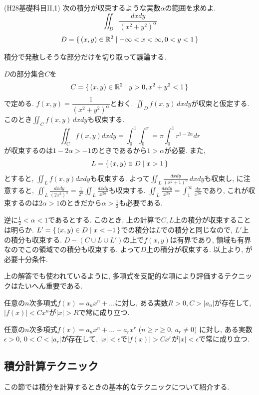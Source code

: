 \begin{egprob} (H28基礎科目II,1)
次の積分が収束するような実数$\alpha$の範囲を求めよ.
\[\iint_{D}\dfrac{dxdy}{(x^2+y^2)^{\alpha}}\]
\[D=\set{(x,y)\in \mathbb{R}^2\mid -\infty<x<\infty, 0<y<1}\]
\end{egprob}
\begin{point}
積分で発散しそうな部分だけを切り取って議論する.
\end{point}
\begin{egans}
$D$の部分集合$C$を
\[C= \set{(x,y)\in \mathbb{R}^2\mid y>0, x^2+y^2<1}\]
で定める. $f(x,y) = \dfrac{1}{(x^2+y^2)^{\alpha}}$とおく. $\iint_{D}f(x,y)\,dxdy$が収束と仮定する. このとき$\iint_{C}f(x,y)\,dxdy$も収束する.
\[\iint_{C}f(x,y)dxdy = \int_{0}^{1} \int_{0}^{\pi} = \pi\int_{0}^{1}r^{1-2\alpha}dr\]
が収束するのは$1-2\alpha > -1$のときであるから$1>\alpha$が必要. また,
\[L = \set{(x,y)\in D\mid x>1}\]
とすると, $\iint_{L}f(x,y)dxdy$も収束する. よって$\iint_{L}\frac{dxdy}{(x^2+1)^{\alpha}}\,dxdy$も収束し, に注意すると, $\iint_{L}\frac{dxdy}{(2x^2)^{\alpha}} = \frac{1}{2^{\alpha}} \iint_{L}\frac{dxdy}{x^{2\alpha}}$も収束する. $\iint_{L}\frac{dxdy}{x^{2\alpha}} = \int_{1}^{\infty} \frac{dx}{x^{2\alpha}}$であり, これが収束するのは$2\alpha > 1$のときだから$\alpha>\frac{1}{2}$も必要である. \par
逆に$\frac{1}{2}<\alpha<1$であるとする. このとき, 上の計算で$C,L$上の積分が収束することは明らか. $L' = \set{(x,y)\in D\mid x<-1}$での積分は$L$での積分と同じなので, $L'$上の積分も収束する. $D-(C\cup L\cup L')$の上で$f(x,y)$は有界であり, 領域も有界なのでこの領域での積分も収束する. よって$D$上の積分が収束する. 以上より, が必要十分条件.
\end{egans}

上の解答でも使われているように, 多項式を支配的な項により評価するテクニックはたいへん重要である.
\begin{prop}
\ben
\item 任意の$n$次多項式$f(x) = a_nx^n + \dots$に対し, ある実数$R>0, C>|a_n|$が存在して, $|f(x)| < Cx^n$が$|x|>R$で常に成り立つ.
\item 任意の$n$次多項式$f(x)=a_nx^n + \dots + a_rx^r$ ($n\geq r\geq 0$, $a_r\neq 0$) に対し, ある実数$\epsilon>0$, $0<C<|a_r|$が存在して, $|x| < \epsilon$で$|f(x)| > Cx^r$が$|x| < \epsilon$で常に成り立つ.
\een
\end{prop}


\newpage
\subsection{積分計算テクニック}
この節では積分を計算するときの基本的なテクニックについて紹介する.
